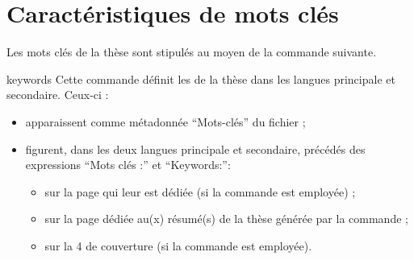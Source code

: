 \section{Caractéristiques de mots clés}
\label{sec:proprietes-de-mots}

Les mots clés de la thèse sont stipulés au moyen de la commande
 suivante.
%
\begin{docCommand}[doc description=\mandatory]{keywords}{}
  Cette commande définit les  de la thèse dans
  les langues principale et secondaire. Ceux-ci :
  \begin{itemize}
  \item apparaissent comme métadonnée \enquote{Mots-clés} du fichier \pdf ;
  \item figurent, dans les deux langues principale et secondaire, précédés des
    expressions \enquote{Mots clés :} et
    \foreignquote{english}{Keywords:}\selonlangue :
    \begin{itemize}
    \item sur la page qui leur est dédiée (si la commande 
      est employée) ;
    \item sur la page dédiée au(x) résumé(s) de la thèse générée par la
      commande  ;
    \item sur la 4\ieme{} de couverture (si la commande 
      est employée).
    \end{itemize}
  \end{itemize}
\end{docCommand}
%
\iffalse
\fi
